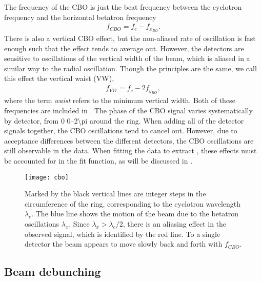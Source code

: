 The frequency of the CBO is just the beat frequency between the cyclotron frequency and the horizontal betatron frequency
        \begin{align} \label{eq:CBOfreq}
            f_{CBO} = f_{c}-f_{x_{BO}}.
        \end{align}
There is also a vertical CBO effect, but the non-aliased rate of oscillation is fast enough such that the effect tends to average out. However, the detectors are sensitive to oscillations of the vertical width of the beam, which is aliased in a similar way to the radial oscillation. Though the principles are the same, we call this effect the vertical waist (VW),
        \begin{align} \label{eq:VWfreq}
            f_{VW} = f_{c}-2f_{y_{BO}},
        \end{align}
where the term \textit{waist} refers to the minimum vertical width. Both of these frequencies are included in . The phase of the CBO signal varies systematically by detector, from 0 \SIrange{0}{2\pi}{} around the ring. When adding all of the detector signals together, the CBO oscillations tend to cancel out. However, due to acceptance differences between the different detectors, the CBO oscillations are still observable in the data. When fitting the data to extract \wa, these effects must be accounted for in the fit function, as will be discussed in .


\begin{figure}
    \centering
    \texttt{[image: cbo]}
    \caption[Coherent betatron oscillation]{Marked by the black vertical lines are integer steps in the circumference of the ring, corresponding to the cyclotron wavelength $\lambda_{c}$. The blue line shows the motion of the beam due to the betatron oscillations $\lambda_{x}$. Since $\lambda_{x} > \lambda_{c}/2$, there is an aliasing effect in the observed signal, which is identified by the red line. To a single detector the beam appears to move slowly back and forth with $f_{CBO}$.}
    \label{fig:cbo}
\end{figure}


\subsection{Beam debunching}
\label{sub:beam_debunching}

